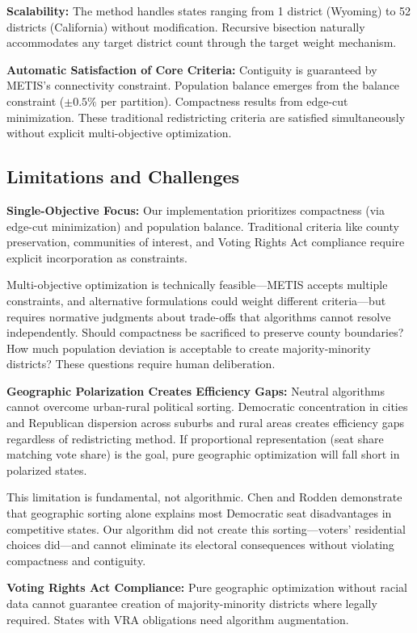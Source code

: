 \textbf{Scalability:} The method handles states ranging from 1 district (Wyoming) to 52 districts (California) without modification. Recursive bisection naturally accommodates any target district count through the target weight mechanism.

\textbf{Automatic Satisfaction of Core Criteria:} Contiguity is guaranteed by METIS's connectivity constraint. Population balance emerges from the balance constraint ($\pm 0.5\%$ per partition). Compactness results from edge-cut minimization. These traditional redistricting criteria are satisfied simultaneously without explicit multi-objective optimization.

\subsection{Limitations and Challenges}

\textbf{Single-Objective Focus:} Our implementation prioritizes compactness (via edge-cut minimization) and population balance. Traditional criteria like county preservation, communities of interest, and Voting Rights Act compliance require explicit incorporation as constraints.

Multi-objective optimization is technically feasible—METIS accepts multiple constraints, and alternative formulations could weight different criteria—but requires normative judgments about trade-offs that algorithms cannot resolve independently. Should compactness be sacrificed to preserve county boundaries? How much population deviation is acceptable to create majority-minority districts? These questions require human deliberation.

\textbf{Geographic Polarization Creates Efficiency Gaps:} Neutral algorithms cannot overcome urban-rural political sorting. Democratic concentration in cities and Republican dispersion across suburbs and rural areas creates efficiency gaps regardless of redistricting method. If proportional representation (seat share matching vote share) is the goal, pure geographic optimization will fall short in polarized states.

This limitation is fundamental, not algorithmic. Chen and Rodden \cite{chen2013unintentional} demonstrate that geographic sorting alone explains most Democratic seat disadvantages in competitive states. Our algorithm did not create this sorting—voters' residential choices did—and cannot eliminate its electoral consequences without violating compactness and contiguity.

\textbf{Voting Rights Act Compliance:} Pure geographic optimization without racial data cannot guarantee creation of majority-minority districts where legally required. States with VRA obligations need algorithm augmentation.

